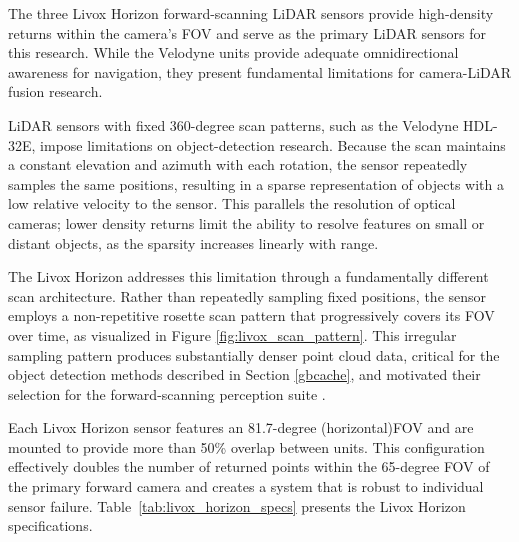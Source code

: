 The three Livox Horizon forward-scanning \ac{LiDAR} sensors provide high-density returns within the camera's \ac{FOV} and serve as the primary \ac{LiDAR} sensors for this research.
While the Velodyne units provide adequate omnidirectional awareness for navigation, they present fundamental limitations for camera-\ac{LiDAR} fusion research.

LiDAR sensors with fixed 360-degree scan patterns, such as the Velodyne HDL-32E, impose limitations on object-detection research.
Because the scan maintains a constant elevation and azimuth with each rotation, the sensor repeatedly samples the same positions, resulting in a sparse representation of objects with a low relative velocity to the sensor.
This parallels the resolution of optical cameras; lower density returns limit the ability to resolve features on small or distant objects, as the sparsity increases linearly with range.

The Livox Horizon addresses this limitation through a fundamentally different scan architecture.
Rather than repeatedly sampling fixed positions, the sensor employs a non-repetitive rosette scan pattern that progressively covers its \ac{FOV} over time, as visualized in Figure \ref{fig:livox_scan_pattern}.
This irregular sampling pattern produces substantially denser point cloud data, critical for the object detection methods described in Section \ref{gbcache}, and motivated their selection for the forward-scanning perception suite \cite{thompson2023}.


Each Livox Horizon sensor features an 81.7-degree (horizontal)\ac{FOV} and are mounted to provide more than 50\% overlap between units.
This configuration effectively doubles the number of returned points within the 65-degree \ac{FOV} of the primary forward camera and creates a system that is robust to individual sensor failure.
Table~\ref{tab:livox_horizon_specs} presents the Livox Horizon specifications.

